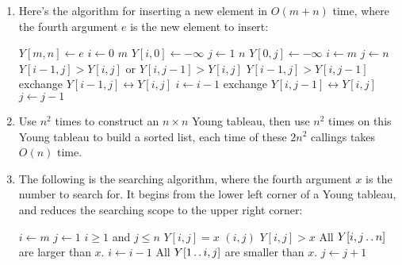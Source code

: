 \documentclass[a4paper, fleqn]{article}
\begin{document}
\begin{enumerate}
\item  %
Here's the algorithm for inserting a new element in $O(m+n)$ time, where the 
fourth argument $e$ is the new element to insert:
\begin{codebox}
\li $Y[m,n] \gets e$
\li \For $i \gets 0$ \To $m$
\li     \Do $Y[i,0] \gets -\infty$
        \End
\li \For $j \gets 1$ \To $n$
\li     \Do $Y[0,j] \gets -\infty$
        \End
\li $i \gets m$
\li $j \gets n$
\li \While $Y[i-1,j] > Y[i,j]$ or $Y[i,j-1] > Y[i,j]$
\li     \Do
            \If $Y[i-1,j] > Y[i, j-1]$
\li             \Then
                    exchange $Y[i-1,j] \leftrightarrow Y[i,j]$
\li                 $i \gets i-1$
\li             \Else
                    exchange $Y[i,j-1] \leftrightarrow Y[i,j]$
\li                 $j \gets j-1$
                \End
         \End
\end{codebox}



\item  %
Use  $n^2$ times to construct an $n \times n$ Young tableau, 
then use  $n^2$ times on this Young tableau to build a sorted 
list, each time of these $2n^2$ callings takes $O(n)$ time.



\item  %
The following is the searching algorithm, where the fourth argument $x$ is the 
number to search for. It begins from the lower left corner of a Young tableau, 
and reduces the searching scope to the upper right corner:
\begin{codebox}
\li $i \gets m$
\li $j \gets 1$
\li \While $i \geq 1$ and $j \leq n$
\li     \Do
            \If $Y[i,j] = x$
\li             \Then \Return $(i,j)$
                \End
\li         \If $Y[i,j] > x$
\li             \Then
                    \Comment All $Y[i, j \mathinner{\ldotp\ldotp} n]$ are larger than $x$.
\li                 $i \gets i - 1$
\li             \Else
                    \Comment All $Y[1 \mathinner{\ldotp\ldotp} i, j]$ are smaller than $x$.
\li                 $j \gets j + 1$
                \End
        \End
\li \Return {}
\end{codebox}

\end{enumerate}
\end{document}
